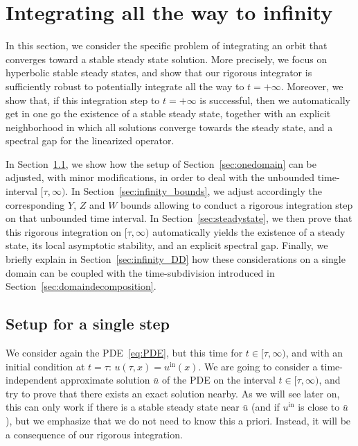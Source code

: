 \documentclass[10pt,a4paper]{article}
\theoremstyle{plain}
\newcommand{\bu}{\bar{u}}
\newcommand{\1}{\mathbf{1}}
\newcommand{\uin}{{u^{\mathrm{in}}}}
\begin{document}



\section{Integrating all the way to infinity}
\label{sec:infinity}



In this section, we consider the specific problem of integrating an orbit that converges toward a stable steady state solution. 
More precisely, we focus on hyperbolic stable steady states, and show that our rigorous integrator is sufficiently robust to potentially integrate all the way to $t=+\infty$. Moreover, we show that, if this integration step to $t=+\infty$ is successful, then we automatically get in one go the existence of a stable steady state, together with an explicit neighborhood in which all solutions converge towards the steady state, and a spectral gap for the linearized operator.

In Section~\ref{sec:infinity_onedomain}, we show how the setup of Section~\ref{sec:onedomain} can be adjusted, with minor modifications, in order to deal with the unbounded time-interval $[\tau,\infty)$. In Section~\ref{sec:infinity_bounds}, we adjust accordingly the corresponding $Y$, $Z$ and $W$ bounds allowing to conduct a rigorous integration step on that unbounded time interval. In Section~\ref{sec:steadystate}, we then prove that this rigorous integration on $[\tau,\infty)$ automatically yields the existence of a steady state, its local asymptotic stability, and an explicit spectral gap. Finally, we briefly explain in Section~\ref{sec:infinity_DD} how these considerations on a single domain can be coupled with the time-subdivision introduced in Section~\ref{sec:domaindecomposition}.

\subsection{Setup for a single step}
\label{sec:infinity_onedomain}

We consider again the PDE~\eqref{eq:PDE}, but this time for $t\in[\tau,\infty)$, and with an initial condition at $t=\tau$: $u(\tau,x) = \uin(x)$. We are going to consider a time-independent approximate solution $\bu$ of the PDE on the interval $t\in[\tau,\infty)$, and try to prove that there exists an exact solution nearby. As we will see later on, this can only work if there is a stable steady state near $\bu$ (and if $\uin$ is close to $\bu$), but we emphasize that we do not need to know this a priori. Instead, it will be a consequence of our rigorous integration.
\end{document}
